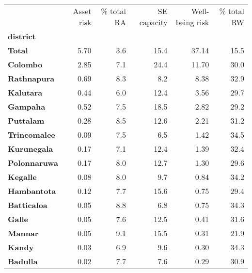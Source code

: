 \begin{tabular}{lrrrrr}
\toprule
{} &  Asset risk &  \% total RA &  SE capacity &  Well-being risk &  \% total RW \\
\textbf{district    } &             &             &              &                  &             \\
\midrule
\textbf{Total       } &        5.70 &         3.6 &         15.4 &            37.14 &        15.5 \\
\textbf{Colombo     } &        2.85 &         7.1 &         24.4 &            11.70 &        30.0 \\
\textbf{Rathnapura  } &        0.69 &         8.3 &          8.2 &             8.38 &        32.9 \\
\textbf{Kalutara    } &        0.44 &         6.0 &         12.4 &             3.56 &        29.7 \\
\textbf{Gampaha     } &        0.52 &         7.5 &         18.5 &             2.82 &        29.2 \\
\textbf{Puttalam    } &        0.28 &         8.5 &         12.6 &             2.21 &        31.2 \\
\textbf{Trincomalee } &        0.09 &         7.5 &          6.5 &             1.42 &        34.5 \\
\textbf{Kurunegala  } &        0.17 &         7.1 &         12.4 &             1.39 &        32.4 \\
\textbf{Polonnaruwa } &        0.17 &         8.0 &         12.7 &             1.30 &        29.6 \\
\textbf{Kegalle     } &        0.08 &         8.0 &          9.7 &             0.84 &        34.2 \\
\textbf{Hambantota  } &        0.12 &         7.7 &         15.6 &             0.75 &        29.4 \\
\textbf{Batticaloa  } &        0.05 &         8.8 &          6.8 &             0.75 &        34.3 \\
\textbf{Galle       } &        0.05 &         7.6 &         12.5 &             0.41 &        31.6 \\
\textbf{Mannar      } &        0.05 &         9.1 &         15.5 &             0.31 &        21.9 \\
\textbf{Kandy       } &        0.03 &         6.9 &          9.6 &             0.30 &        34.3 \\
\textbf{Badulla     } &        0.02 &         7.7 &          7.6 &             0.29 &        30.9 \\

\end{tabular}

